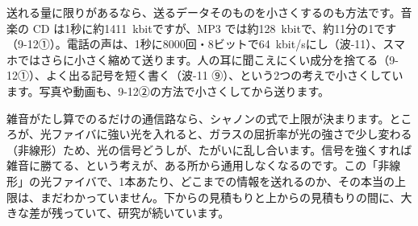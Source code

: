 送れる量に限りがあるなら、送るデータそのものを小さくするのも方法です。音楽の CD は1秒に約\qty{1411}{kbit}ですが、MP3 では約\qty{128}{kbit}で、約11分の1です（9-12①）。電話の声は、1秒に8000回・8ビットで\qty{64}{kbit/s}にし（波-11）、スマホではさらに小さく縮めて送ります。人の耳に聞こえにくい成分を捨てる（9-12①）、よく出る記号を短く書く（波-11 ⑨）、という2つの考えで小さくしています。写真や動画も、9-12②の方法で小さくしてから送ります。

\begin{phmada}
雑音がたし算でのるだけの通信路なら、シャノンの式で上限が決まります。ところが、光ファイバに強い光を入れると、ガラスの屈折率が光の強さで少し変わる（非線形）ため、光の信号どうしが、たがいに乱し合います。信号を強くすれば雑音に勝てる、という考えが、ある所から通用しなくなるのです。この「非線形」の光ファイバで、1本あたり、どこまでの情報を送れるのか、その本当の上限は、まだわかっていません。下からの見積もりと上からの見積もりの間に、大きな差が残っていて、研究が続いています。
\end{phmada}


